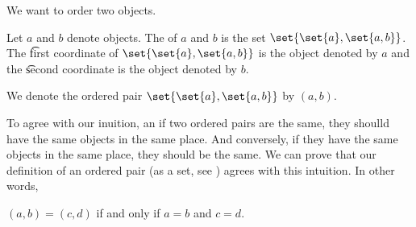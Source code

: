 

We want to order two objects.


Let $a$ and $b$ denote objects.
The  of $a$ and $b$ is the set $\set{\set{a}, \set{a, b}}$.
The \t{first coordinate} of $\set{\set{a}, \set{a, b}}$ is the object denoted by $a$ and the \t{second coordinate} is the object denoted by $b$.



We denote the ordered pair $\set{\set{a},\set{a,b}}$ by $(a, b)$.

To agree with our inuition, an if two ordered pairs are the same, they shoulld have the same objects in the same place.
And conversely, if they have the same objects in the same place, they should be the same.
We can prove that our definition of an ordered pair (as a set, see ) agrees with this intuition.
In other words,

\begin{proposition}
  $(a, b) = (c, d)$ if and only if $a = b$ and $c = d$.
\end{proposition}


